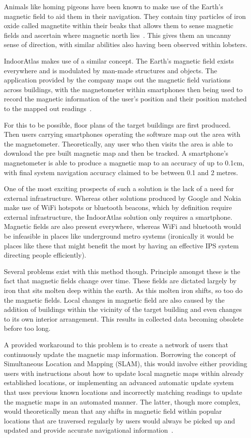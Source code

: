\documentclass[12pt,a4paper]{report}
\begin{document}
Animals like homing pigeons have been known to make use of the Earth's magnetic field to aid them in their navigation. They contain tiny particles of iron oxide called magnetite within their beaks that allows them to sense magnetic fields and ascertain where magnetic north lies~\cite{pigeon}. This gives them an uncanny sense of direction, with similar abilities also having been observed within lobsters. 
 
IndoorAtlas makes use of a similar concept. The Earth's magnetic field exists everywhere and is modulated by man-made structures and objects. The application provided by the company maps out the magnetic field variations across buildings, with the magnetometer within smartphones then being used to record the magnetic information of the user's position and their position matched to the mapped out readings~\cite{IAReport}.
 
For this to be possible, floor plans of the target buildings are first produced. Then users carrying smartphones operating the software map out the area with the magnetometer. Theoretically, any user who then visits the area is able to download the pre built magnetic map and then be tracked. A smartphone's magnetometer is able to produce a magnetic map to an accuracy of up to 0.1cm, with final system navigation accuracy claimed to be between 0.1 and 2 metres. 
 
One of the most exciting prospects of such a solution is the lack of a need for external infrastructure. Whereas other solutions produced by Google and Nokia make use of WiFi hotspots or bluetooth beacons, which by definition require external infrastructure, the IndoorAtlas solution only requires a smartphone. Magnetic fields are also present everywhere, whereas WiFi and bluetooth would be infeasible in places like underground metro systems (ironically it would be places like these that might benefit the most by having an effective IPS system directing people efficiently).
 
Several problems exist with this method though. Principle amongst these is the fact that magnetic fields change over time. These fields are dictated largely by iron that sits molten deep within the earth. As this molten iron shifts, so too do the magnetic fields. Local changes in magnetic field are also caused by the addition of buildings within the vicinity of the target building and even changes to its own interior arrangement. This results in collected data becoming obsolete before too long.
 
 A provided workaround to this problem is to create a network of users that continuously update the magnetic map information. Borrowing the concept of Simultaneous Location and Mapping (SLAM), this would involve either providing users with instructions about how to update local magnetic maps within already established locations, or implementing an advanced automatic update system that uses previous known locations and incorrectly matching readings to update the magnetic maps in an automated manner. The latter, though more complex, would theoretically mean that any shifts in magnetic field within popular locations that are traversed regularly by users would always be picked up and updated and provide accurate navigational information~\cite{IAReport}.
 
\end{document}
